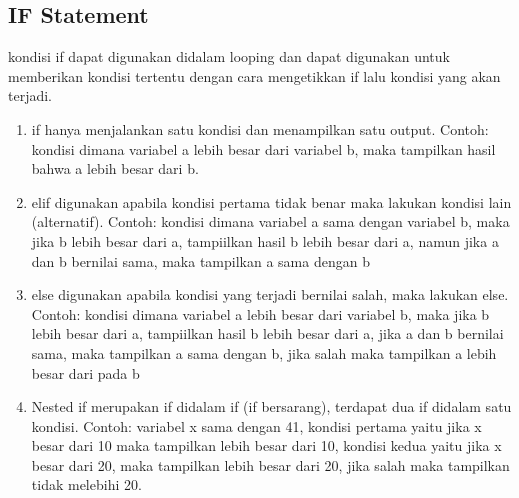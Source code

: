 \subsection{IF Statement}
kondisi if dapat digunakan didalam looping dan dapat digunakan untuk memberikan kondisi tertentu dengan cara mengetikkan if lalu kondisi yang akan terjadi.\\
\begin{enumerate}
 \item if hanya menjalankan satu kondisi dan menampilkan satu output. Contoh: kondisi dimana variabel a lebih besar dari variabel b, maka tampilkan hasil bahwa a lebih besar dari b.

 \item elif digunakan apabila kondisi pertama tidak benar maka lakukan kondisi lain (alternatif). Contoh: kondisi dimana variabel a sama dengan variabel b, maka jika b lebih besar dari a, tampiilkan hasil b lebih besar dari a, namun jika a dan b bernilai sama, maka tampilkan a sama dengan b

\item else digunakan apabila kondisi yang terjadi bernilai salah, maka lakukan else. Contoh: kondisi dimana variabel a lebih besar dari variabel b, maka jika b lebih besar dari a, tampiilkan hasil b lebih besar dari a, jika a dan b bernilai sama, maka tampilkan a sama dengan b, jika salah maka tampilkan a lebih besar dari pada b

\item Nested if merupakan if didalam if (if bersarang), terdapat dua if didalam satu kondisi. Contoh: variabel x sama dengan 41, kondisi pertama yaitu jika x besar dari 10 maka tampilkan lebih besar dari 10, kondisi kedua yaitu jika x besar dari 20, maka tampilkan lebih besar dari 20, jika salah maka tampilkan tidak melebihi 20.

\end{enumerate}

